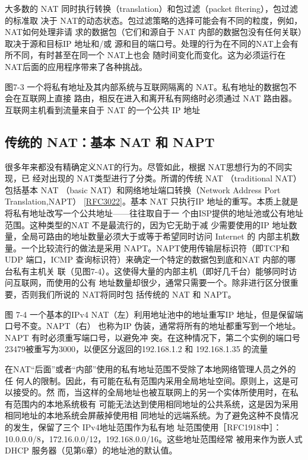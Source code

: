 大多数的 NAT 同时执行转换（translation）和包过滤（packet fltering），包过滤的标准取
决于 NAT的动态状态。包过滤策略的选择可能会有不同的粒度，例如，NAT如何处理非请
求的数据包（它们和源自于 NAT 内部的数据包没有任何关联）取决于源和目标IP 地址和/或
源和目的端口号。处理的行为在不同的NAT上会有所不同，有时甚至在同一个 NAT上也会
随时间变化而变化。这为必须运行在 NAT后面的应用程序带来了各种挑战。

图7-3 一个将私有地址及其内部系统与互联网隔离的 NAT。私有地址的数据包不会在互联网上直接
路由，相反在进入和离开私有网络时必须通过 NAT 路由器。互联网主机看到流量来自于 NAT
的一个公共 IP 地址

\subsection{传统的 NAT：基本 NAT 和 NAPT}

很多年来都没有精确定义NAT的行为。尽管如此，根据 NAT思想行为的不同实现，已
经对出现的 NAT类型进行了分类。所谓的传统 NAT （traditional NAT）包括基本 NAT （basic
NAT）和网络地址端口转换（Network Address Port Translation,NAPT） \href{https://www.rfc-editor.org/rfc/rfc3022}{[RFC3022]}。基本
NAT 只执行IP 地址的重写。本质上就是将私有地址改写一个公共地址——往往取自于一
个由ISP提供的地址池或公有地址范围。这种类型的NAT 不是最流行的，因为它无助于减
少需要使用的IP 地址数量，全局可路由的地址数量必须大于或等于希望同时访问 Internet 的
内部主机数量。一个比较流行的做法是采用 NAPT。NAPT使用传输层标识符（即TCP和
UDP 端口，ICMP 查询标识符）来确定一个特定的数据包到底和NAT 内部的哪台私有主机关
联（见图7-4）。这使得大量的内部主机（即好几千台）能够同时访问互联网，而使用的公有
地址数量却很少，通常只需要一个。除非进行区分很重要，否则我们所说的 NAT将同时包
括传统的 NAT 和 NAPT。

图 7-4
一个基本的IPv4 NAT（左）利用地址池中的地址重写IP 地址，但是保留端口号不变。NAPT（右）
也称为IP 伪装，通常将所有的地址都重写到一个地址。NAPT 有时必须重写端口号，以避免冲
突。在这种情况下，第二个实例的端口号23479被重写为3000，以便区分返回的192.168.1.2 和
192.168.1.35 的流量

在NAT“后面”或者“内部”使用的私有地址范围不受除了本地网络管理人员之外的任
何人的限制。因此，有可能在私有范围内采用全局地址空间。原则上，这是可以接受的。然
而，当这样的全局地址也被互联网上的另一个实体所使用时，在私有范围内的本地系统极有
可能无法达到使用相同地址的公共系统，这是因为采用相同地址的本地系统会屏蔽掉使用相
同地址的远端系统。为了避免这种不良情况的发生，保留了三个 IPv4地址范围作为私有地
址范围使用［RFC1918中］：10.0.0.0/8，172.16.0.0/12，192.168.0.0/16。这些地址范围经常
被用来作为嵌人式 DHCP 服务器（见第6章）的地址池的默认值。

